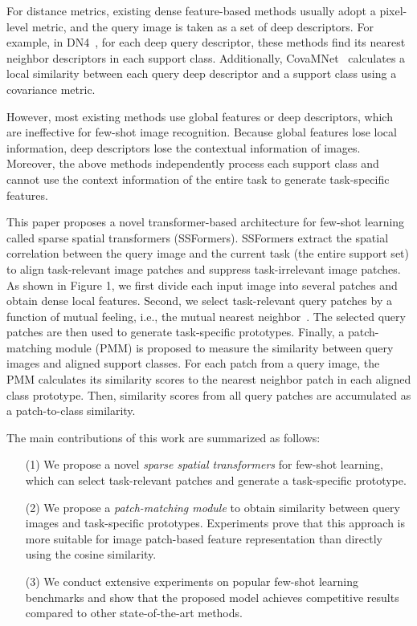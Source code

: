 \documentclass{SCIS2019}
\begin{document}
For distance metrics, existing dense feature-based methods usually adopt a pixel-level metric, and the query image is taken as a set of deep descriptors. For example, in DN4~\cite{9}, for each deep query descriptor, these methods find its nearest neighbor descriptors in each support class. Additionally, CovaMNet~\cite{16} calculates a local similarity between each query deep descriptor and a support class using a covariance metric.

However, most existing methods use global features or deep descriptors, which are ineffective for few-shot image recognition. Because global features lose local information, deep descriptors lose the contextual information of images. Moreover, the above methods independently process each support class and cannot use the context information of the entire task to generate task-specific features.

This paper proposes a novel transformer-based architecture for few-shot learning called sparse spatial transformers (SSFormers). SSFormers extract the spatial correlation between the query image and the current task (the entire support set) to align task-relevant image patches and suppress task-irrelevant image patches. As shown in Figure 1, we first divide each input image into several patches and obtain dense local features. Second, we select task-relevant query patches by a function of mutual feeling, i.e., the mutual nearest neighbor~\cite{17,18}. The selected query patches are then used to generate task-specific prototypes. Finally, a patch-matching module (PMM) is proposed to measure the similarity between query images and aligned support classes. For each patch from a query image, the PMM calculates its similarity scores to the nearest neighbor patch in each aligned class prototype. Then, similarity scores from all query patches are accumulated as a patch-to-class similarity.

The main contributions of this work are summarized as follows: 

\begin{itemize}
	\itemindent 2.8em
	\item[(1)] We propose a novel \emph{sparse spatial transformers} for few-shot learning, which can select task-relevant patches and generate a task-specific prototype.
	
	\item[(2)] We propose a \emph{patch-matching module} to obtain similarity between query images and task-specific prototypes. Experiments prove that this approach is more suitable for image patch-based feature representation than directly using the cosine similarity.
	
	\item[(3)] We conduct extensive experiments on popular few-shot learning benchmarks and show that the proposed model achieves competitive results compared to other state-of-the-art methods.
\end{itemize}
\end{document}
